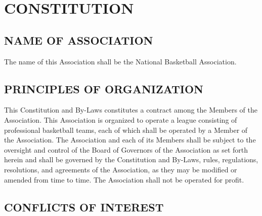 \documentclass[]{book}
\theoremstyle{definition}
\theoremstyle{definition}
\theoremstyle{definition}
\theoremstyle{remark}
\begin{document}
\chapter{CONSTITUTION}\label{constitution}

\section{NAME OF ASSOCIATION}\label{name-of-association}

The name of this Association shall be the National Basketball
Association.

\section{PRINCIPLES OF ORGANIZATION}\label{principles-of-organization}

This Constitution and By-Laws constitutes a contract among the Members
of the Association. This Association is organized to operate a league
consisting of professional basketball teams, each of which shall be
operated by a Member of the Association. The Association and each of its
Members shall be subject to the oversight and control of the Board of
Governors of the Association as set forth herein and shall be governed
by the Constitution and By-Laws, rules, regulations, resolutions, and
agreements of the Association, as they may be modified or amended from
time to time. The Association shall not be operated for profit.

\section{CONFLICTS OF INTEREST}\label{conflicts-of-interest}
\end{document}
